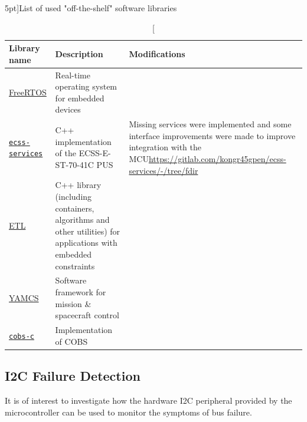 \documentclass[a4paper,nobib]{tufte-book}
\begin{document}
\begin{table}[h]
	\centering
	\vspace{2em}
	\caption[][5pt]{List of used "off-the-shelf" software libraries}
	\label{tab:old_software}
	\begin{tabularx}{\textwidth}{@{}lp{6cm}X@{}}
		\toprule
		Library name & Description & Modifications \\ \midrule
		\href{https://www.freertos.org/}{FreeRTOS} & Real-time operating system for embedded devices & \\
		\href{https://gitlab.com/acubesat/obc/ecss-services}{\texttt{ecss-services}} & C++ implementation of the ECSS-E-ST-70-41C \acl{PUS} %
		& \small Missing services were implemented and some interface improvements were made to improve integration with the \acs{MCU}\newline\small\url{https://gitlab.com/kongr45gpen/ecss-services/-/tree/fdir}
		 \\
		 \href{https://www.etlcpp.com/}{\acs{ETL}}  & C++ library (including containers, algorithms and other utilities) for applications with embedded constraints &
		 \\
 		\href{https://github.com/yamcs/yamcs}{\acs{YAMCS}}  & Software framework for mission \& spacecraft control & %
 		\\
		\href{https://github.com/cmcqueen/cobs-c}{\texttt{cobs-c}}  & Implementation of \ac{COBS} %
		 & \\
		\bottomrule
	\end{tabularx}
\end{table}



\subsection{\ac{I2C} Failure Detection}

It is of interest to investigate how the hardware \ac{I2C} peripheral provided by the microcontroller can be used to monitor the symptoms of bus failure.
\end{document}
